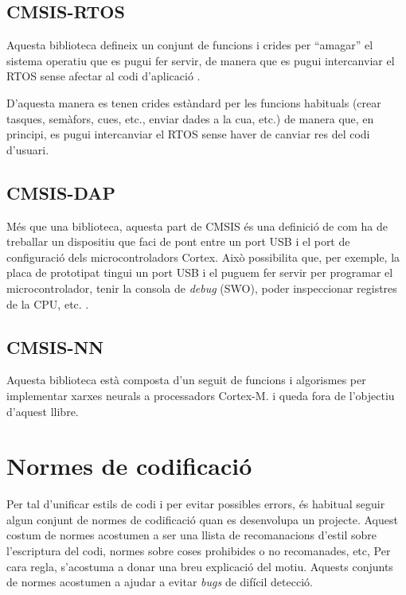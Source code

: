 \section{CMSIS-RTOS}
\label{sec:CMSIS-RTOS}
Aquesta biblioteca defineix un conjunt de funcions i crides per ``amagar'' el sistema operatiu que es pugui fer servir, de manera que es pugui intercanviar el \gls{RTOS} sense afectar al codi d'aplicació \cite{CMSIS-RTOS}.

D'aquesta manera es tenen crides estàndard per les funcions habituals (crear tasques, semàfors, cues, etc., enviar dades a la cua, etc.) de manera que, en principi, es pugui intercanviar el RTOS sense haver de canviar res del codi d'usuari.

\section{CMSIS-DAP}
\label{sec:CMSIS-DAP}
Més que una biblioteca, aquesta part de CMSIS és una definició de com ha de treballar un dispositiu que faci de pont entre un port USB i el port de configuració dels microcontroladors Cortex. Això possibilita que, per exemple, la placa de prototipat tingui un port USB i el puguem fer servir per programar el microcontrolador, tenir la consola de {\em debug} (SWO), poder inspeccionar registres de la CPU, etc. \cite{CMSIS-DAP}.

\section{CMSIS-NN}
\label{sec:CMSIS-NN}
Aquesta biblioteca està composta d'un seguit de funcions i algorismes per implementar xarxes neurals a processadors Cortex-M. \cite{CMSIS_NN_paper}\cite{CMSIS-NN} i queda fora de l'objectiu d'aquest llibre.

\chapter{Normes de codificació}
\label{sec:GuiesProgramacio}

Per tal d'unificar estils de codi i per evitar possibles errors, és habitual seguir algun conjunt de normes de codificació quan es desenvolupa un projecte. Aquest costum de normes acostumen a ser una llista de recomanacions d'estil sobre l'escriptura del codi, normes sobre coses prohibides o no recomanades, etc, Per cara regla, s'acostuma a donar una breu explicació del motiu. Aquests conjunts de normes acostumen a ajudar a evitar {\em bugs} de difícil detecció.

